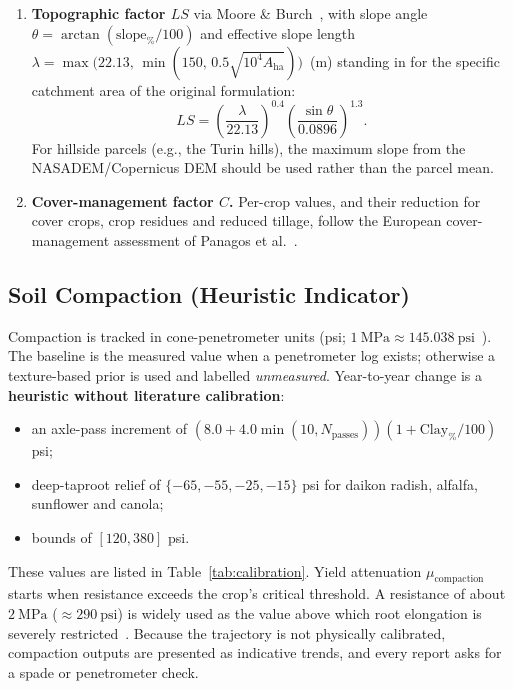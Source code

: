 \begin{enumerate}[leftmargin=1.5em]
\begin{equation}
  \end{equation}
  where $0.1317$ converts US customary units to SI.
  \item \textbf{Topographic factor $LS$} via Moore \& Burch~\cite{moore1986physical}, with slope angle $\theta = \arctan(\mathrm{slope}_{\%}/100)$ and effective slope length $\lambda = \max\bigl(22.13,\, \min(150,\, 0.5\sqrt{10^4 A_{\mathrm{ha}}})\bigr)$~(m) standing in for the specific catchment area of the original formulation:
  \begin{equation}
    LS = \left(\frac{\lambda}{22.13}\right)^{0.4} \left(\frac{\sin\theta}{0.0896}\right)^{1.3}.
  \end{equation}
  For hillside parcels (e.g., the Turin hills), the maximum slope from the NASADEM/Copernicus DEM should be used rather than the parcel mean.
  \item \textbf{Cover-management factor $C$.} Per-crop values, and their reduction for cover crops, crop residues and reduced tillage, follow the European cover-management assessment of Panagos et al.~\cite{panagos2015cfactor}.
\end{enumerate}

\subsection{Soil Compaction (Heuristic Indicator)}
Compaction is tracked in cone-penetrometer units (psi; $1~\mathrm{MPa} \approx 145.038~\mathrm{psi}$~\cite{asabe2019s313}). The baseline is the measured value when a penetrometer log exists; otherwise a texture-based prior is used and labelled \emph{unmeasured}. Year-to-year change is a \textbf{heuristic without literature calibration}:
\begin{itemize}[leftmargin=1.5em]
  \item an axle-pass increment of $(8.0 + 4.0\min(10, N_{\mathrm{passes}}))(1 + \mathrm{Clay}_{\%}/100)$ psi;
  \item deep-taproot relief of $\{-65, -55, -25, -15\}$ psi for daikon radish, alfalfa, sunflower and canola;
  \item bounds of $[120, 380]$ psi.
\end{itemize}
These values are listed in Table~\ref{tab:calibration}. Yield attenuation $\mu_{\mathrm{compaction}}$ starts when resistance exceeds the crop's critical threshold. A resistance of about $2~\mathrm{MPa}$ ($\approx 290~\mathrm{psi}$) is widely used as the value above which root elongation is severely restricted~\cite{bengough2011root}. Because the trajectory is not physically calibrated, compaction outputs are presented as indicative trends, and every report asks for a spade or penetrometer check.
